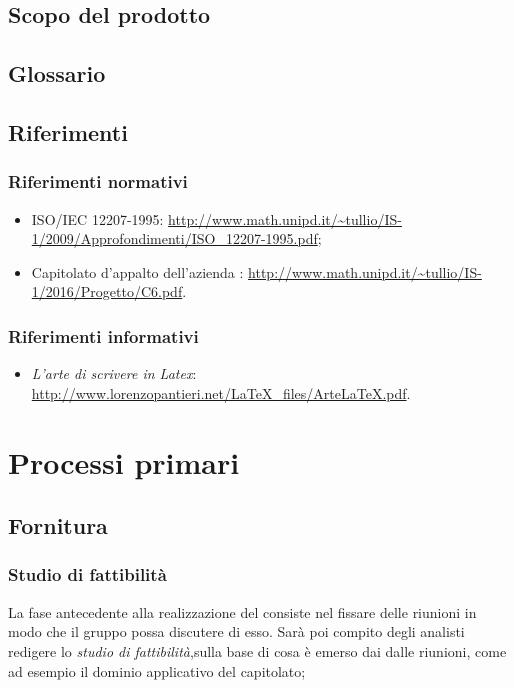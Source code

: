 		\subsection{Scopo del prodotto}
			\scopo
		
		\subsection{Glossario}
			\presgloss
		
		\subsection{Riferimenti}
		
		\subsubsection{Riferimenti normativi}
			\begin{itemize}
				\item ISO/IEC 12207-1995: \url{http://www.math.unipd.it/\~tullio/IS-1/2009/Approfondimenti/ISO_12207-1995.pdf};
				\item Capitolato d'appalto dell'azienda \ZU: \url{http://www.math.unipd.it/~tullio/IS-1/2016/Progetto/C6.pdf}. %
			\end{itemize}
		
		\subsubsection{Riferimenti informativi}
			\begin{itemize}
				\item \emph{L'arte di scrivere in Latex}: \url{http://www.lorenzopantieri.net/LaTeX_files/ArteLaTeX.pdf}.
			\end{itemize}




\section{Processi primari} \label{sec:primari}
	\subsection{Fornitura}
		\subsubsection{Studio di fattibilità}
			La fase antecedente alla realizzazione del  consiste nel fissare delle riunioni in modo che il gruppo possa discutere di esso. Sarà poi compito degli analisti redigere lo \textit{studio di fattibilità},sulla base di cosa è emerso dai dalle riunioni, come ad esempio il dominio applicativo del capitolato;
